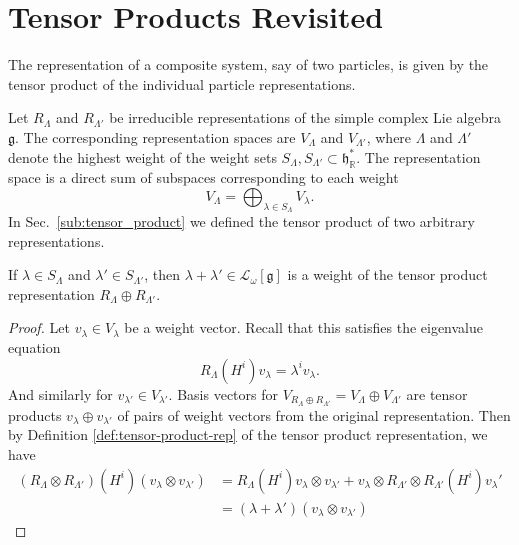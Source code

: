 \section{Tensor Products Revisited}%
\label{sec:tensor_products_revisited}

The representation of a composite system, say of two particles, is given by the tensor product of the individual particle representations.

Let $R_{\Lambda}$ and $R_{\Lambda'}$  be irreducible representations of the simple complex Lie algebra $\mathfrak{g}$. The corresponding representation spaces are $V_\Lambda$ and  $V_{\Lambda'}$, where $\Lambda$ and $\Lambda'$ denote the highest weight of the weight sets $S_{\Lambda}, S_{\Lambda'} \subset \mathfrak{h}_{\mathbb{R}}^*$.
The representation space is a direct sum of subspaces corresponding to each weight
 \begin{equation}
  V_{\Lambda} = \bigoplus_{\lambda \in S_\Lambda} V_{\lambda}.
\end{equation}
In Sec.~\ref{sub:tensor_product} we defined the tensor product of two arbitrary representations.

\begin{claim}
  If $\lambda \in S_\Lambda$ and $\lambda' \in S_{\Lambda'}$, then $\lambda + \lambda' \in \mathcal{L}_\omega [\mathfrak{g}]$ is a weight of the tensor product representation $R_{\Lambda} \oplus R_{\Lambda'}$.
\end{claim}
\begin{proof}
  Let $v_{\lambda} \in V_{\lambda}$ be a weight vector. Recall that this satisfies the eigenvalue equation
  \begin{equation}
    R_{\Lambda}(H^{i}) v_{\lambda} = \lambda^{i} v_{\lambda}.
  \end{equation}
  And similarly for $v_{\lambda'} \in V_{\lambda'}$.
  Basis vectors for $V_{R_\Lambda \oplus R_{\Lambda'}} = V_{\Lambda} \oplus V_{\Lambda'}$ are tensor products $v_{\lambda} \oplus v_{\lambda'}$ of pairs of weight vectors from the original representation.
  Then by Definition \ref{def:tensor-product-rep} of the tensor product representation, we have
  \begin{align}
    (R_{\Lambda} \otimes R_{\Lambda'})(H^{i}) (v_{\lambda} \otimes v_{\lambda'}) &= R_{\Lambda}(H^{i}) v_{\lambda} \otimes v_{\lambda'} + v_\lambda \otimes R_{\Lambda'} \otimes R_{\Lambda'} (H^{i}) v_{\lambda}' \\
										 &= (\lambda + \lambda') (v_{\lambda} \otimes v_{\lambda'})
  \end{align}
\end{proof}

